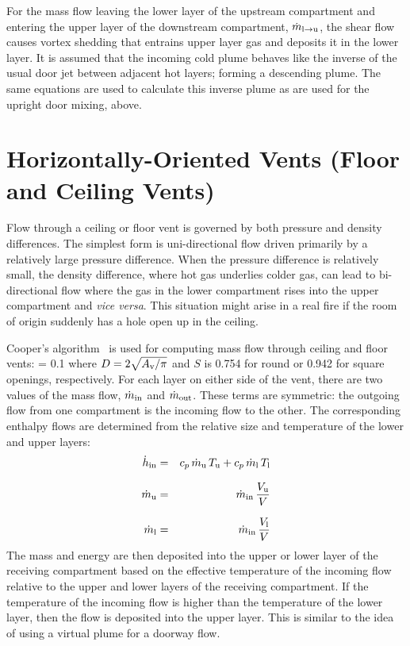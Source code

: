 For the mass flow leaving the lower layer of the upstream compartment and entering the upper layer of the downstream compartment, $\dot{m}_{\rm l \to u}$, the shear flow causes vortex shedding that entrains upper layer gas and deposits it in the lower layer. It is assumed that the incoming cold plume behaves like the inverse of the usual door jet between adjacent hot layers; forming a descending plume.  The same equations are used to calculate this inverse plume as are used for the upright door mixing, above.

\section{Horizontally-Oriented Vents (Floor and Ceiling Vents)}

Flow through a ceiling or floor vent is governed by both pressure and density differences. The simplest form is uni-directional flow driven primarily by a relatively large pressure difference. When the pressure difference is relatively small, the density difference, where hot gas underlies colder gas, can lead to bi-directional flow where the gas in the lower compartment rises into the upper compartment and {\em vice versa}.  This situation might arise in a real fire if the room of origin suddenly has a hole open up in the ceiling.

Cooper's algorithm~\cite{Cooper:1989, Cooper:1990, Cooper:1995} is used for computing mass flow through ceiling and floor vents:
\be
   \dm = 0.1  
\ee
where $D = 2 \sqrt{A_{\rm v} / \pi}$ and $S$ is 0.754 for round or 0.942 for square openings, respectively. For each layer on either side of the vent, there are two values of the mass flow, $\dot{m}_{\rm in}$ and $\dot{m}_{\rm out}$. These terms are symmetric: the outgoing flow from one compartment is the incoming flow to the other. The corresponding enthalpy flows are determined from the relative size and temperature of the lower and upper layers:
\begin{eqnarray}
  \dot{h}_{\rm in} &=& c_p \, \dot{m}_{\rm u} \, T_{\rm u} + c_p \, \dot{m}_{\rm l} \, T_{\rm l} \\[0.1in]
  \dot{m}_{\rm u} &=& \dot{m}_{\rm in} \, \frac{V_{\rm u}}{V} \\[0.1in]
  \dot{m}_{\rm l} &=& \dot{m}_{\rm in} \, \frac{V_{\rm l}}{V}
\end{eqnarray}
The mass and energy are then deposited into the upper or lower layer of the receiving compartment based on the effective temperature of the incoming flow relative to the upper and lower layers of the receiving compartment. If the temperature of the incoming flow is higher than the temperature of the lower layer, then the flow is deposited into the upper layer. This is similar to the idea of using a virtual plume for a doorway flow.


